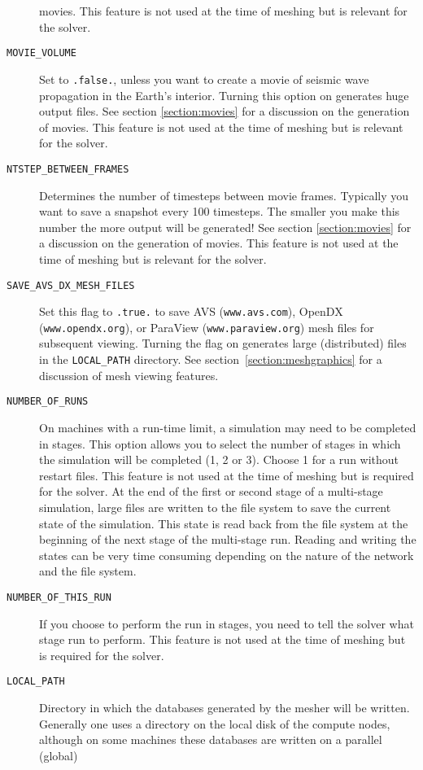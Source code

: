 \documentclass[onecolumn]{article}
\begin{document}
\begin{description}
movies.
This feature is not used at the time of meshing but
is relevant for the solver.
\item[\texttt{MOVIE\_VOLUME}] Set to \texttt{.false.}, unless you want to
create a movie of seismic wave propagation in the Earth's interior.
Turning this option on generates huge output files.
See section \ref{section:movies} for a discussion on the generation of
movies.
This feature is not used at the time of meshing but
is relevant for the solver.
\item[\texttt{NTSTEP\_BETWEEN\_FRAMES}] Determines the number of timesteps
between movie frames. Typically you want to save a snapshot every 100
timesteps. The smaller you make this number the more output will be generated!
See section \ref{section:movies} for a discussion on the generation of
movies.
This feature is not used at the time of meshing but
is relevant for the solver.
\item[\texttt{SAVE\_AVS\_DX\_MESH\_FILES}] Set this flag to \texttt{.true.}
to save AVS (\texttt{www.avs.com}), OpenDX (\texttt{www.opendx.org}),
or ParaView (\texttt{www.paraview.org})
mesh files for subsequent viewing.
Turning the flag on generates large (distributed)
files in the \texttt{LOCAL\_PATH} directory.
See section~\ref{section:meshgraphics} for a discussion
of mesh viewing features.
\item[\texttt{NUMBER\_OF\_RUNS}] On machines with a run-time limit, a simulation
may need to be completed in stages. This option allows you to select the number of
stages in which the simulation will be completed (1, 2 or 3). Choose 1 for
a run without restart files.
This feature is not used at the time of meshing but
is required for the solver.
At the end of the first or second stage of a multi-stage simulation,
large files are written to the file system to save the current
state of the simulation. This state is read back from the file system
at the beginning of the next stage of the multi-stage run.
Reading and writing the states can be very time consuming depending on
the nature of the network and the file system.
\item[\texttt{NUMBER\_OF\_THIS\_RUN}] If you choose to perform the run in
stages, you need to tell the solver what stage run to perform.
This feature is not used at the time of meshing but
is required for the solver.
\item[\texttt{LOCAL\_PATH}]
Directory in which the databases generated by the mesher will be written.
Generally one uses a directory on the local disk of the compute nodes,
although on some machines these databases are written on a parallel (global)

\end{description}
\end{document}
